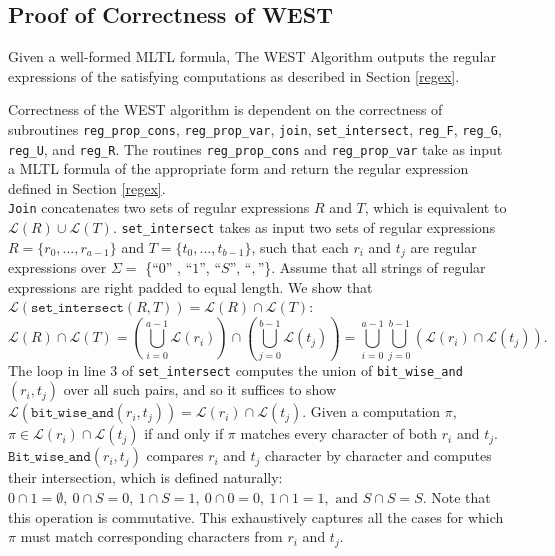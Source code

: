 \documentclass[runningheads]{llncs}
\begin{document}
\subsection{Proof of Correctness of WEST}
\begin{theorem} \label{theocorrect}
  Given a well-formed MLTL formula, The WEST Algorithm outputs the regular expressions of the satisfying computations as described in Section \ref{regex}.
\end{theorem}
Correctness of the WEST algorithm is dependent on the correctness of subroutines \texttt{reg\_prop\_cons}, \texttt{reg\_prop\_var}, \texttt{join}, \texttt{set\_intersect}, \texttt{reg\_F}, \texttt{reg\_G}, \texttt{reg\_U}, and \texttt{reg\_R}. 
The routines \texttt{reg\_prop\_cons} and \texttt{reg\_prop\_var} take as input a MLTL formula of the appropriate form and return the regular expression defined in Section \ref{regex}.\\
\texttt{Join} concatenates two sets of regular expressions $R$ and $T$, which is equivalent to $\mathscr{L}(R) \cup \mathscr{L}(T)$. \texttt{set\_intersect} takes as input two sets of regular expressions $R = \{r_0, ..., r_{a-1}\}$ and $T = \{t_0, ..., t_{b-1}\}$, such that each $r_i$
and $t_j$ are regular expressions over $\Sigma =$ \{``$0$'' , ``$1$'', ``$S$'', ``$,$''\}.
Assume that all strings of regular expressions are right padded to equal length. 
We show that $\mathscr{L}(\texttt{set\_intersect}(R, T)) = \mathscr{L}(R) \cap \mathscr{L}(T)$:
$$\mathscr{L}(R) \cap \mathscr{L}(T) = \left(\bigcup_{i = 0}^{a-1} \mathscr{L}(r_i) \right)\cap \left( \bigcup_{j = 0}^{b-1} \mathscr{L}(t_j)\right) = \bigcup_{i = 0}^{a-1} \bigcup_{j = 0}^{b-1} \left(\mathscr{L}(r_i) \cap \mathscr{L}(t_j)\right).$$
The loop in line 3 of \texttt{set\_intersect} computes the union of \texttt{bit\_wise\_and}$(r_i, t_j)$ over all such pairs, and so it suffices to show $\mathscr{L}(\texttt{bit\_wise\_and}(r_i, t_j)) = \mathscr{L}(r_i) \cap \mathscr{L}(t_j)$.  
Given a computation $\pi$, $\pi \in \mathscr{L}(r_i) \cap \mathscr{L}(t_j)$ if and only if $\pi$ matches every character of both $r_i$ and $t_j$. 
$\texttt{Bit\_wise\_and}(r_i, t_j)$ compares $r_i$ and $t_j$ character by character and computes their intersection, which is defined naturally: $0 \cap 1 = \emptyset,\ 0 \cap S = 0,\ 1 \cap S = 1, \ 0 \cap 0 = 0, \ 1 \cap 1= 1,\text{ and } S \cap S = S$. 
Note that this operation is commutative. This exhaustively captures all the cases for which $\pi$ must match corresponding characters from $r_i$ and $t_j$. 
\end{document}
